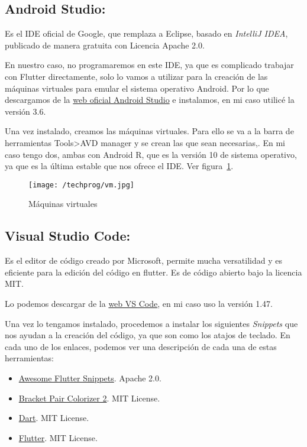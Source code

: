 \subsection{Android Studio:}
Es el IDE oficial de Google, que remplaza a Eclipse, basado en \emph{IntelliJ IDEA}, publicado de manera gratuita con Licencia Apache 2.0.

En nuestro caso, no programaremos en este IDE, ya que es complicado trabajar con Flutter directamente, solo lo vamos a utilizar para la creación de las máquinas virtuales para emular el sistema operativo Android. Por lo que descargamos de la \href{https://developer.android.com/studio}{web oficial Android Studio} e instalamos, en mi caso utilicé la versión 3.6.

Una vez instalado, creamos las máquinas virtuales. Para ello se va a la barra de herramientas Tools>AVD manager y se crean las que sean necesarias,. En mi caso tengo dos, ambas con Android R, que es la versión 10 de sistema operativo, ya que es la última estable que nos ofrece el IDE. Ver figura~\ref{fig:astudio}.

\begin{figure}%
	\centering
	\texttt{[image: /techprog/vm.jpg]}
	\caption{Máquinas virtuales}
	\label{fig:astudio}
\end{figure}


\subsection{Visual Studio Code:}
Es el editor de código creado por Microsoft, permite mucha versatilidad y es eficiente para la edición del código en flutter. Es de código abierto bajo la licencia MIT.

Lo podemos descargar de la \href{https://code.visualstudio.com/}{web VS Code}, en mi caso uso la versión 1.47.

Una vez lo tengamos instalado, procedemos a instalar los siguientes \emph{Snippets} que nos ayudan a la creación del código, ya que son como los atajos de teclado. En cada uno de los enlaces, podemos ver una descripción de cada una de estas herramientas:

\begin{itemize}
	\tightlist
	\item \href{https://marketplace.visualstudio.com/items?itemName=Nash.awesome-flutter-snippets}{Awesome Flutter Snippets}. Apache 2.0.
	\item \href{https://marketplace.visualstudio.com/items?itemName=CoenraadS.bracket-pair-colorizer-2}{Bracket Pair Colorizer 2}. MIT License.
	\item \href{https://marketplace.visualstudio.com/items?itemName=Dart-Code.dart-code}{Dart}. MIT License.
	\item \href{https://marketplace.visualstudio.com/items?itemName=Dart-Code.flutter}{Flutter}. MIT License.
\end{itemize}

